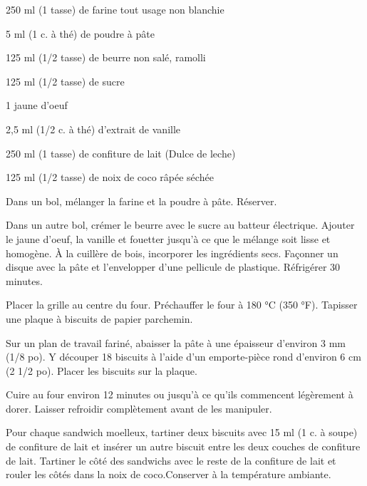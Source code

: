 


\totaltime{}


\begin{ingredients}
    \item 250 ml (1 tasse) de farine tout usage non blanchie
    \item 5 ml (1 c. à thé) de poudre à pâte
    \item 125 ml (1/2 tasse) de beurre non salé, ramolli
    \item 125 ml (1/2 tasse) de sucre
    \item 1 jaune d'oeuf
    \item 2,5 ml (1/2 c. à thé) d'extrait de vanille
    \item 250 ml (1 tasse) de confiture de lait (Dulce de leche)
    \item 125 ml (1/2 tasse) de noix de coco râpée séchée
\end{ingredients}

\begin{steps}
    \item Dans un bol, mélanger la farine et la poudre à pâte. Réserver.
    \item Dans un autre bol, crémer le beurre avec le sucre au batteur électrique. Ajouter le jaune d'oeuf, la vanille et fouetter jusqu'à ce que le mélange soit lisse et homogène. À la cuillère de bois, incorporer les ingrédients secs. Façonner un disque avec la pâte et l'envelopper d'une pellicule de plastique. Réfrigérer 30 minutes.
    \item Placer la grille au centre du four. Préchauffer le four à 180 °C (350 °F). Tapisser une plaque à biscuits de papier parchemin.
    \item Sur un plan de travail fariné, abaisser la pâte à une épaisseur d'environ 3 mm (1/8 po). Y découper 18 biscuits à l'aide d'un emporte-pièce rond d'environ 6 cm (2 1/2 po). Placer les biscuits sur la plaque.
    \item Cuire au four environ 12 minutes ou jusqu'à ce qu'ils commencent légèrement à dorer. Laisser refroidir complètement avant de les manipuler.
    \item[] 
    \item Pour chaque sandwich moelleux, tartiner deux biscuits avec 15 ml (1 c. à soupe) de confiture de lait et insérer un autre biscuit entre les deux couches de confiture de lait. Tartiner le côté des sandwichs avec le reste de la confiture de lait et rouler les côtés dans la noix de coco.Conserver à la température ambiante.
\end{steps}
